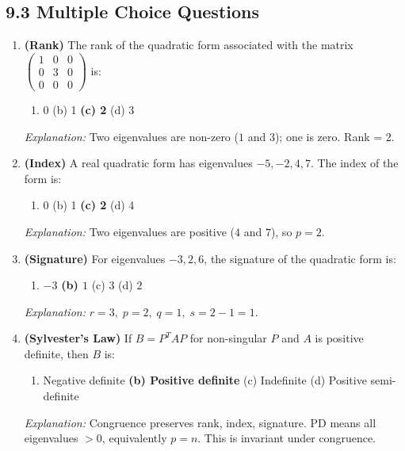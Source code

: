 \documentclass[12pt,a4paper]{article}
\begin{document}
\subsection*{9.3 Multiple Choice Questions}

\begin{enumerate}[label=\textbf{MCQ\arabic*.}, leftmargin=*]

  \item \textbf{(Rank)} The rank of the quadratic form associated with the matrix
        \(\begin{pmatrix} 1 & 0 & 0 \\ 0 & 3 & 0 \\ 0 & 0 & 0 \end{pmatrix}\) is:
        \begin{enumerate}[label=(\alph*), noitemsep]
          \item 0 \quad (b) 1 \quad \textbf{(c) 2} \quad (d) 3
        \end{enumerate}
        \textit{Explanation:} Two eigenvalues are non-zero (\(1\) and \(3\)); one is zero.
        Rank = 2.

  \item \textbf{(Index)} A real quadratic form has eigenvalues \(-5, -2, 4, 7\).
        The index of the form is:
        \begin{enumerate}[label=(\alph*), noitemsep]
          \item 0 \quad (b) 1 \quad \textbf{(c) 2} \quad (d) 4
        \end{enumerate}
        \textit{Explanation:} Two eigenvalues are positive (\(4\) and \(7\)), so \(p = 2\).

  \item \textbf{(Signature)} For eigenvalues \(-3, 2, 6\), the signature of the quadratic
        form is:
        \begin{enumerate}[label=(\alph*), noitemsep]
          \item \(-3\) \quad \textbf{(b) \(1\)} \quad (c) \(3\) \quad (d) \(2\)
        \end{enumerate}
        \textit{Explanation:} \(r = 3,\; p = 2,\; q = 1,\; s = 2 - 1 = 1\).

  \item \textbf{(Sylvester's Law)} If \(B = P^T A P\) for non-singular \(P\) and \(A\) is
        positive definite, then \(B\) is:
        \begin{enumerate}[label=(\alph*), noitemsep]
          \item Negative definite \quad \textbf{(b) Positive definite}
          \quad (c) Indefinite \quad (d) Positive semi-definite
        \end{enumerate}
        \textit{Explanation:} Congruence preserves rank, index, signature. PD means all
        eigenvalues \(> 0\), equivalently \(p = n\). This is invariant under congruence.


\end{enumerate}
\end{document}
